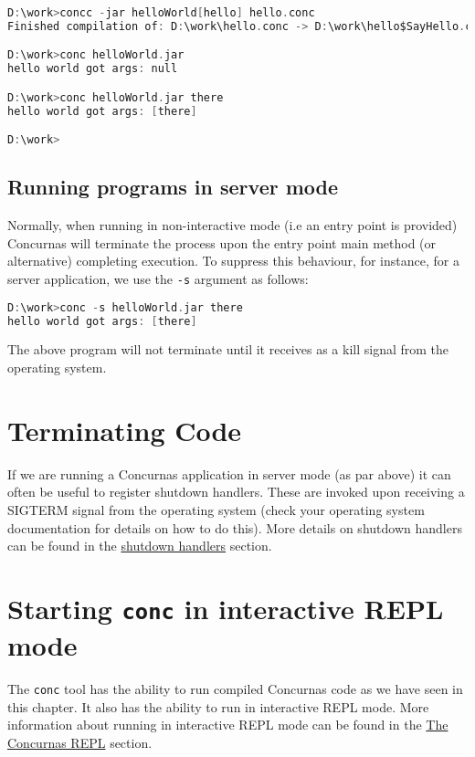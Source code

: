 \documentclass[conc-doc]{subfiles}
\begin{document}
\begin{lstlisting}[language=C]
D:\work>concc -jar helloWorld[hello] hello.conc
Finished compilation of: D:\work\hello.conc -> D:\work\hello$SayHello.class [hello$SayHello], D:\work\hello.class [hello]

D:\work>conc helloWorld.jar
hello world got args: null

D:\work>conc helloWorld.jar there
hello world got args: [there]

D:\work>
\end{lstlisting}


\subsection{Running programs in server mode}
Normally, when running in non-interactive mode (i.e an entry point is provided) Concurnas will terminate the process upon the entry point main method (or alternative) completing execution. To suppress this behaviour, for instance, for a server application, we use the  \lstinline{-s} argument as follows:

\begin{lstlisting}[language=C]
D:\work>conc -s helloWorld.jar there
hello world got args: [there]


\end{lstlisting}

The above program will not terminate until it receives as a kill signal from the operating system.

\section{Terminating Code}
If we are running a Concurnas application in server mode (as par above) it can often be useful to register shutdown handlers. These are invoked upon receiving a SIGTERM signal from the operating system (check your operating system documentation for details on how to do this). More details on shutdown handlers can be found in the \hyperref[sec:shutdownHandle]{shutdown handlers} section. 

\section{Starting \lstinline!conc! in interactive REPL mode}
The \lstinline{conc} tool has the ability to run compiled Concurnas code as we have seen in this chapter. It also has the ability to run in interactive REPL mode. More information about running in interactive REPL mode can be found in the \hyperref[ch:repl]{The Concurnas REPL} section.
\end{document}
